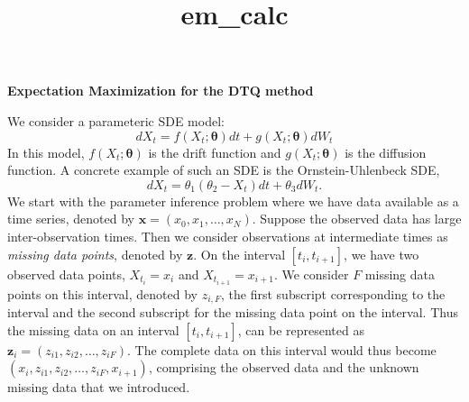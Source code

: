 \documentclass[12pt]{article}
\newcommand{\bx}{\ensuremath{\mathbf{x}}}
\newcommand{\bz}{\ensuremath{\mathbf{z}}}
\newcommand{\btheta}{\ensuremath{\boldsymbol{\theta}}}
\begin{document}
\vspace*{-15mm}
\title{em_calc}
\begin{center}
\Large\textbf{Expectation Maximization for the DTQ method} \\
\normalsize
\end{center}
We consider a parameteric SDE model:
\begin{equation}
dX_t = f(X_t; \btheta) dt + g(X_t; \btheta) dW_t
\end{equation}
In this model, $f(X_t; \btheta)$ is the drift function and $g(X_t; \btheta)$ is the diffusion function.  A concrete example of such an SDE is the Ornstein-Uhlenbeck SDE,
\begin{equation}
dX_t = \theta_1 (\theta_2 - X_t) dt + \theta_3 dW_t.
\end{equation}
We start with the parameter inference problem where we have data available as a time series, denoted by $\bx = (x_0, x_1, \ldots, x_N)$. Suppose the observed data has large inter-observation times.  Then we consider observations at intermediate times as \textit{missing data points}, denoted by $\bz$. On the interval $[t_i, t_{i+1}]$, we have two observed data points, $X_{t_i} = x_i$ and $X_{t_{i+1}} = x_{i+1}$. We consider $F$ missing data points on this interval, denoted by $z_{i,F}$, the first subscript corresponding to the interval and the second subscript for the missing data point on the interval. Thus the missing data on an interval $[t_i, t_{i+1}]$, can be represented as $\bz_i = (z_{i1}, z_{i2}, \ldots, z_{iF})$. The complete data on this interval would thus become $(x_i, z_{i1}, z_{i2}, \ldots, z_{iF}, x_{i+1})$, comprising the observed data and the unknown missing data that we introduced.
\end{document}
